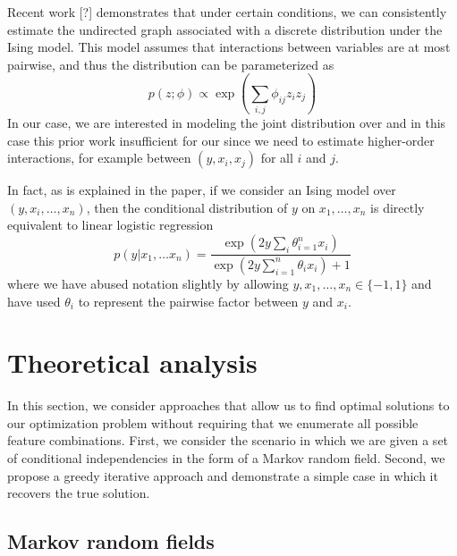 \documentclass[12pt]{article}
\begin{document}
Recent work [?] demonstrates that under certain conditions, we can consistently estimate the undirected graph associated with a discrete distribution under the Ising model. This model assumes that interactions between variables are at most pairwise, and thus the distribution can be parameterized as
\begin{equation}
p(z;\phi) \propto \exp \left( \sum_{i,j} \phi_{ij}z_iz_j \right)
\end{equation}
In our case, we are interested in modeling the joint distribution over and in this case this prior work insufficient for our since we need to estimate higher-order interactions, for example between $(y,x_i,x_j)$ for all $i$ and $j$. 

In fact, as is explained in the paper, if we consider an Ising model over $(y,x_i,\ldots,x_n)$, then the conditional distribution of $y$ on $x_1,\ldots,x_n$ is directly equivalent to linear logistic regression
\begin{equation}
p(y|x_1,\ldots x_n) = \frac{\exp(2 y\sum_i\theta_{i=1}^nx_i)}{\exp(2 y\sum_{i=1}^n\theta_ix_i) + 1}
\end{equation}
where we have abused notation slightly by allowing $y,x_1,\ldots,x_n \in \{-1,1\}$ and have used $\theta_i$ to represent the pairwise factor between $y$ and $x_i$.

\section{Theoretical analysis}

In this section, we consider approaches that allow us to find optimal solutions to our optimization problem without requiring that we enumerate all possible feature combinations. First, we consider the scenario in which we are given a set of conditional independencies in the form of a Markov random field. Second, we propose a greedy iterative approach and demonstrate a simple case in which it recovers the true solution.

\subsection{Markov random fields}
\end{document}
